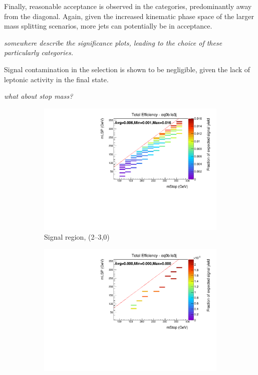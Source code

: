 Finally, reasonable acceptance is observed in the \njhigh categories, 
predominantly away from the diagonal. Again, given the increased kinematic phase
space of the larger mass splitting scenarios, more jets can potentially be in 
acceptance.

\emph{somewhere describe the significance plots, leading to the choice of these 
particularly categories.}

Signal contamination in the \mj selection is shown to be negligible, given the 
lack of leptonic activity in the final state.

\emph{what about stop mass?}

\begin{figure}[ht!]
  \centering
  \begin{subfigure}[b]{0.47\textwidth}
    \includegraphics[width=\textwidth, trim=0 0 0 24, clip=true]{Figs/sms/t2cc/v24/T2cc_v24_had_eff_maps_eq0b_le3j_SITV.pdf}
    \caption{Signal region, (2--3,0)}
    \label{fig:t2cc_sig_eff_le3j_0b}
  \end{subfigure}
  \begin{subfigure}[b]{0.47\textwidth}
    \includegraphics[width=\textwidth, trim=0 0 0 24, clip=true]{Figs/sms/t2cc/v24/T2cc_v24_muon_eff_maps_eq0b_le3j_SITV.pdf}

\end{subfigure}
\end{figure}
